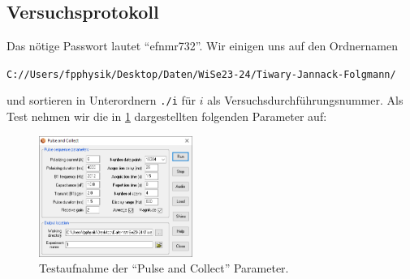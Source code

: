 \documentclass{subfiles}
\begin{document}
    \subsection*{Versuchsprotokoll} 
        Das nötige Passwort lautet \enquote{efnmr732}. Wir einigen uns auf den Ordnernamen 
        \begin{center}
            \texttt{C://Users/fpphysik/Desktop/Daten/WiSe23-24/Tiwary-Jannack-Folgmann/}
        \end{center}
        und sortieren in Unterordnern \texttt{./i} für $i$ als Versuchsdurchführungsnummer. Als Test nehmen wir die in \ref{fig:TestPulseAndCollect} dargestellten folgenden Parameter auf:
        \begin{figure}[H]
            \centering
            \includegraphics[width=5cm]{Live-Dokumente/Bilder/Testaufnahme-Pulse-And-Collect.PNG}
            \caption{Testaufnahme der \enquote{Pulse and Collect} Parameter.}
            \label{fig:TestPulseAndCollect}
        \end{figure}
\end{document}
